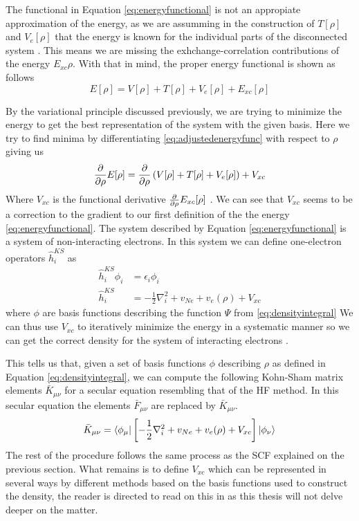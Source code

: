\documentclass[../master_thesis.tex]{subfiles}
\begin{document}
The functional in Equation \ref{eq:energyfunctional} is not an appropiate approximation
of the energy, as we are assumming in the construction of $T[\rho]$ and $V_{e}[\rho]$
that the energy is known for the individual parts of the disconnected system \cite{Sorland}.
This means we are missing the exhchange-correlation contributions of the energy $E_{xc}{\rho}$.
With that in mind, the proper energy functional is shown as follows
\begin{equation}\label{eq:adjustedenergyfunc}
  E[\rho] = V[\rho] + T[\rho] + V_{e}[\rho] + E_{xc}[\rho]
\end{equation}

By the variational principle discussed previously, we are trying to minimize the energy
to get the best representation of the system with the given basis. Here we try to
find minima by differentiating \ref{eq:adjustedenergyfunc} with respect to $\rho$ giving us
\begin{align}\label{eq:energyderiv}
   \frac{\partial}{\partial \rho}E[\rho] = \frac{\partial}{\partial \rho}\left( V[\rho] + T[\rho] + V_{e}[\rho]\right) + V_{xc}
\end{align}
Where $V_{xc}$ is the functional derivative $\frac{\partial}{\partial \rho}E_{xc}[\rho]$ \cite{Cramer:2004}.
We can see that $V_{xc}$ seems to be a correction to the gradient to our first definition
of the the energy \ref{eq:energyfunctional}. The system described by Equation
\ref{eq:energyfunctional} is a system of non-interacting electrons. In this
system we can define one-electron operators $\hat{h}_i^{KS}$ as
\begin{align}
  \hat{h}_i^{KS} \phi_i &= \epsilon_i \phi_i \\
  \hat{h}_i^{KS} &= - \frac{1}{2}\nabla^2_i + v_{Ne} + v_e(\rho) + V_{xc}
\end{align}
where $\phi$ are basis functions describing the function $\Psi$ from \ref{eq:densityintegral}
We can thus use $V_{xc}$ to iteratively minimize the energy in a systematic manner so we can
get the correct density for the system of interacting electrons \cite{Cramer:2004}.

This tells us that, given a set of basis functions $\phi$ describing
$\rho$ as defined in Equation \ref{eq:densityintegral}, we can compute the following
Kohn-Sham  matrix elements $\bar{K}_{\mu\nu}$ for a secular equation resembling that of the \ac{HF}
method. In this secular equation the elements $\bar{F}_{\mu\nu}$ are replaced by $\bar{K}_{\mu\nu}$.
\begin{equation}
  \bar{K}_{\mu\nu} = \braket{\phi_\mu|\left[- \frac{1}{2}\nabla^2_i + v_{Ne} + v_e(\rho) + V_{xc}\right]|\phi_\nu}
\end{equation}
The rest of the procedure follows the same process as the \ac{SCF} explained on
the previous section.
What remains is to define $V_{xc}$ which can be represented in several ways by different methods
based on the basis functions used to construct the density, the reader is directed to
read on this in \cite{Cramer:2004} as this thesis will not delve deeper on the
matter.


\biblio
\end{document}
